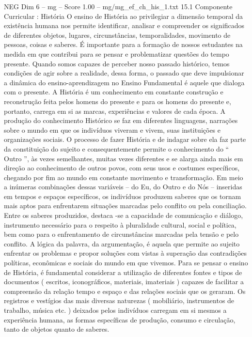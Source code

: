 \begin{textsample}{NEG Dim 6 – mg – Score 1.00 – mg/mg\_ef\_ch\_his\_1.txt}  \label{ex:f6_neg_048}
15.1 Componente Curricular : História O ensino de História ao privilegiar a dimensão temporal da existência humana nos permite identificar, analisar e compreender os significados de diferentes objetos, lugares, circunstâncias, temporalidades, movimento de pessoas, coisas e saberes.
É importante para a formação de nossos estudantes na medida em que contribui para se pensar e problematizar questões do tempo presente.
Quando somos capazes de perceber nosso passado histórico, temos condições de agir sobre a realidade, dessa forma, o passado que deve impulsionar a dinâmica do ensino-aprendizagem no Ensino Fundamental é aquele que dialoga com o presente.
A História é um conhecimento em constante construção e reconstrução feita pelos homens do presente e para os homens do presente e, portanto, carrega em si as marcas, experiências e valores de cada época.
A produção do conhecimento Histórico se faz em diferentes linguagens, narrações sobre o mundo em que os indivíduos viveram e vivem, suas instituições e organizações sociais.
O processo de fazer História e de indagar sobre ela faz parte da constituição do sujeito e consequentemente permite o conhecimento do “ Outro ”, às vezes semelhantes, muitas vezes diferentes e se alarga ainda mais em direção ao conhecimento de outros povos, com seus usos e costumes específicos, chegando por fim ao mundo em constante movimento e transformação.
Em meio a inúmeras combinações dessas variáveis – do Eu, do Outro e do Nós – inseridas em tempos e espaços específicos, os indivíduos produzem saberes que os tornam mais aptos para enfrentarem situações marcadas pelo conflito ou pela conciliação.
Entre os saberes produzidos, destaca -se a capacidade de comunicação e diálogo, instrumento necessário para o respeito à pluralidade cultural, social e política, bem como para o enfrentamento de circunstâncias marcadas pela tensão e pelo conflito.
A lógica da palavra, da argumentação, é aquela que permite ao sujeito enfrentar os problemas e propor soluções com vistas à superação das contradições políticas, econômicas e sociais do mundo em que vivemos.
Para se pensar o ensino de História, é fundamental considerar a utilização de diferentes fontes e tipos de documentos ( escritos, iconográficos, materiais, imateriais ) capazes de facilitar a compreensão da relação tempo e espaço e das relações sociais que os geraram.
Os registros e vestígios das mais diversas naturezas ( mobiliário, instrumentos de trabalho, música etc. ) deixados pelos indivíduos carregam em si mesmos a experiência humana, as formas específicas de produção, consumo e circulação, tanto de objetos quanto de saberes.

\end{textsample}
